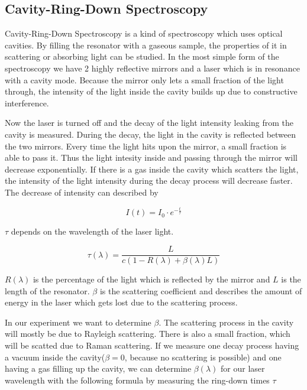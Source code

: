 \documentclass[12pt,a4paper]{article}
\begin{document}
\subsection{Cavity-Ring-Down Spectroscopy}

Cavity-Ring-Down Spectroscopy is a kind of spectroscopy which uses optical cavities. By filling the resonator with a gaseous sample, the properties of it in scattering or absorbing light can be studied. In the most simple form of the spectroscopy we have 2 highly reflective mirrors and a laser which is in resonance with a cavity mode. Because the mirror only lets a small fraction of the light through, the intensity of the light inside the cavity builds up due to constructive interference. 

Now the laser is turned off and the decay of the light intensity leaking from the cavity is measured. During the decay, the light in the cavity is reflected between the two mirrors. Every time the light hits upon the mirror, a small fraction is able to pass it. Thus the light intesity inside and passing through the mirror will decrease exponentially. If there is a gas inside the cavity which scatters the light, the intensity of the light intensity during the decay process will decrease faster. The decrease of intensity can described by

\begin{equation}
I(t) = I_0 \cdot e^{- \frac{t}{\tau}}
\end{equation}

$\tau$ depends on the wavelength of the laser light.

\begin{equation}
\tau (\lambda) = \frac{L}{c (1- R(\lambda) + \beta(\lambda) L)}
\label{tau_formel}
\end{equation}

$R(\lambda)$ is the percentage of the light which is reflected by the mirror and $L$ is the length of the resonator. $\beta$ is the scattering coefficient and describes the amount of energy in the laser which gets lost due to the scattering process.

In our experiment we want to determine $\beta$. The scattering process in the cavity will mostly be due to Rayleigh scattering. There is also a small fraction, which will be scatted due to Raman scattering. If we measure one decay process having a vacuum inside the cavity($\beta = 0$, because no scattering is possible) and one having a gas filling up the cavity, we can determine $\beta(\lambda)$ for our laser wavelength with the following formula by measuring the ring-down times $\tau$
\end{document}
